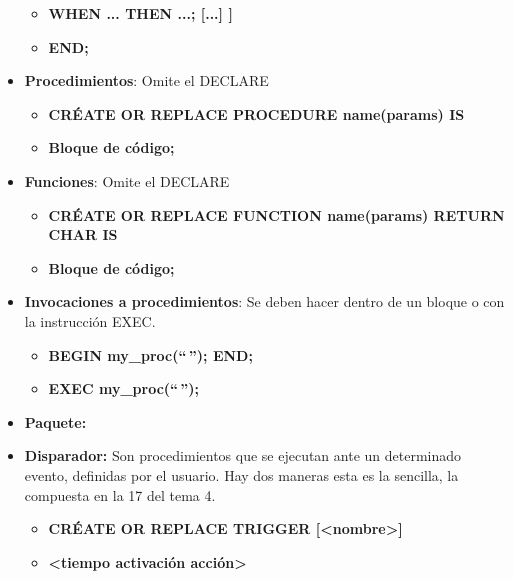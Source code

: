 \documentclass[12pt, twoside, openright]{report} %
\begin{document}
\begin{itemize}
\begin{itemize}
    \item \textbf{WHEN ... THEN ...; {[}...{]} {]}}
      
    \item \textbf{END;}
      
    \end{itemize}
  \item \textbf{Procedimientos}: Omite el DECLARE
    

    \begin{itemize}
    \item \textbf{CRÉATE OR REPLACE PROCEDURE name(params) IS}
      
    \item \textbf{Bloque de código;}
      
    \end{itemize}
  \item \textbf{Funciones}: Omite el DECLARE
    

    \begin{itemize}
    \item \textbf{CRÉATE OR REPLACE FUNCTION name(params) RETURN CHAR IS}
      
    \item \textbf{Bloque de código;}
      
    \end{itemize}
  \item \textbf{Invocaciones a procedimientos}: Se deben hacer dentro de un
    bloque o con la instrucción EXEC.
    

    \begin{itemize}
    \item \textbf{BEGIN my\_proc(``\,''); END;}
      
    \item \textbf{EXEC my\_proc(``\,'');}
      
    \end{itemize}
  \item \textbf{Paquete:}
    
  \item \textbf{Disparador:} Son procedimientos que se ejecutan ante un
    determinado evento, definidas por el usuario. Hay dos maneras esta
    es la sencilla, la compuesta en la 17 del tema 4.
    

    \begin{itemize}
    \item \textbf{CRÉATE OR REPLACE TRIGGER
      {[}\textless nombre\textgreater{]}}
      
    \item \textbf{\textless tiempo activación acción\textgreater{}}
      


\end{itemize}
\end{itemize}
\end{document}
